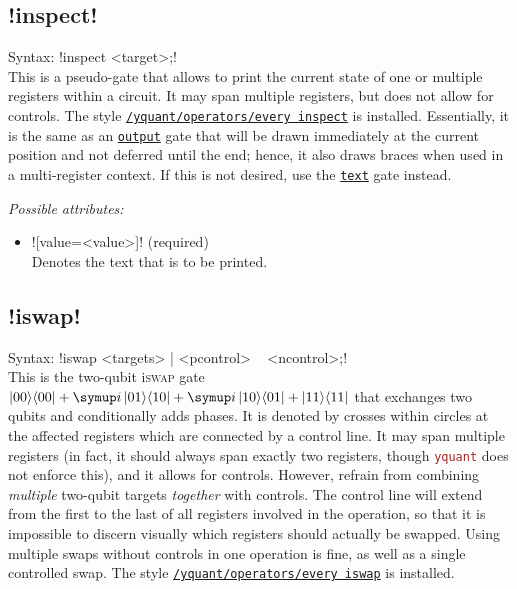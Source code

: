 \documentclass{scrartcl}
\def\pkg#1{\textcolor{brown}{\texttt{#1}}}
\def\gate#1{\hyperref[gate:#1]{\texttt{#1}}}
\def\style#1{\hyperref[style:#1]{\texttt{#1}}}
\def\Yquant{\pkg{yquant}}
\def\ii{{\symup i}}
\def\ketbra#1#2{\ket{#1}\!\bra{#2}}
\begin{document}
      \subsection[\texorpdfstring{\yquant{inspect}}{inspect}]{\yquant!inspect!}\label{gate:inspect}
         Syntax: \yquant!inspect <target>;! \\
         This is a pseudo\hyp gate that allows to print the current state of one or multiple registers within a circuit.
         It may span multiple registers, but does not allow for controls.
         The style \style{/yquant/operators/every inspect} is installed.
         Essentially, it is the same as an \gate{output} gate that will be drawn immediately at the current position and not deferred until the end; hence, it also draws braces when used in a multi\hyp register context.
         If this is not desired, use the \gate{text} gate instead.

         \emph{Possible attributes:}
         \begin{itemize}
            \item \yquant![value=<value>]! (required) \\
               Denotes the text that is to be printed.
         \end{itemize}

      \subsection[\texorpdfstring{\yquant{iswap}}{iswap}]{\yquant!iswap!}\label{gate:iswap}
         Syntax: \yquant!iswap <targets> | <pcontrol> ~ <ncontrol>;! \\
         This is the two\hyp qubit i\textsc{swap} gate $\ketbra{00}{00} + \ii\ketbra{01}{10} + \ii\ketbra{10}{01} + \ketbra{11}{11}$ that exchanges two qubits and conditionally adds phases.
         It is denoted by crosses within circles at the affected registers which are connected by a control line.
         It may span multiple registers (in fact, it should always span exactly two registers, though \Yquant{} does not enforce this), and it allows for controls.
         However, refrain from combining \emph{multiple} two\hyp qubit targets \emph{together} with controls.
         The control line will extend from the first to the last of all registers involved in the operation, so that it is impossible to discern visually which registers should actually be swapped.
         Using multiple swaps without controls in one operation is fine, as well as a single controlled swap.
         The style \style{/yquant/operators/every iswap} is installed.
\end{document}
